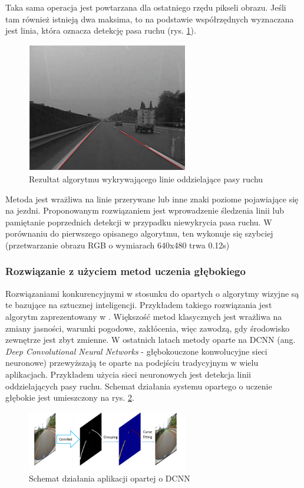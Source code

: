 Taka sama operacja jest powtarzana dla ostatniego rzędu pikseli obrazu. 
Jeśli tam również istnieją dwa maksima, to na podstawie współrzędnych wyznaczana jest linia, która oznacza detekcję pasa ruchu (rys. \ref{fig:lane_detection2_result}).

\begin{figure}
  \centering
  \includegraphics[width=7cm]{img/lane_detection2_result.png}
  \caption{Rezultat algorytmu wykrywającego linie oddzielające pasy ruchu\cite{T6}}
  \label{fig:lane_detection2_result}
\end{figure}

Metoda jest wrażliwa na linie przerywane lub inne znaki poziome pojawiające się na jezdni. Proponowanym rozwiązaniem jest wprowadzenie śledzenia linii lub pamiętanie poprzednich detekcji w przypadku niewykrycia pasa ruchu.
W porównaniu do pierwszego opisanego algorytmu, ten wykonuje się szybciej (przetwarzanie obrazu RGB o wymiarach 640x480 trwa 0.12s)

\subsubsection{Rozwiązanie z użyciem metod uczenia głębokiego}

Rozwiązaniami konkurencyjnymi w stosunku do opartych o algorytmy wizyjne są te bazujące na sztucznej inteligencji. Przykładem takiego rozwiązania jest algorytm zaprezentowany w \cite{T6}.
Większość metod klasycznych jest wrażliwa na zmiany jasności, warunki pogodowe, zakłócenia, więc zawodzą, gdy środowisko zewnętrze jest zbyt zmienne. 
W ostatnich latach metody oparte na DCNN (ang. \textit{Deep Convolutional Neural Networks} - głębokouczone konwolucyjne sieci neuronowe) przewyższają te oparte na podejściu tradycyjnym w wielu aplikacjach. 
Przykładem użycia sieci neuronowych jest detekcja linii oddzielających pasy ruchu. 
Schemat działania systemu opartego o uczenie głębokie jest umieszczony na rys. \ref{fig:lane_detection3_cnn_general}.
\begin{figure}
  \centering
  \includegraphics[width=7cm]{img/lane_detection3_cnn_general.png}
  \caption{Schemat działania aplikacji opartej o DCNN\cite{T6}}
  \label{fig:lane_detection3_cnn_general}
\end{figure}

